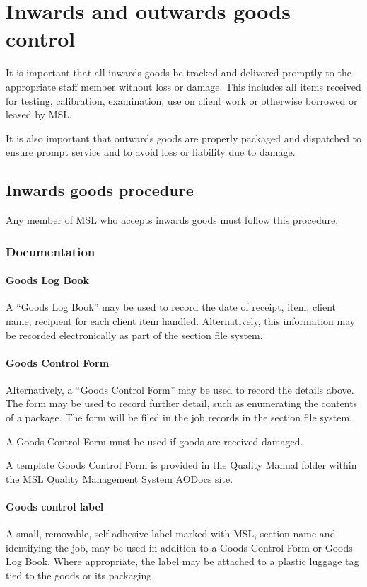 \section{Inwards and outwards goods control}
\label{s:inwards_outwards_goods}
It is important that all inwards goods be tracked and delivered promptly to the appropriate staff member without loss or damage. This includes all items received for testing, calibration, examination, use on client work or otherwise borrowed or leased by MSL.

It is also important that outwards goods are properly packaged and dispatched to ensure prompt service and to avoid loss or liability due to damage.

\subsection{Inwards goods procedure}
Any member of MSL who accepts inwards goods must follow this procedure.

\subsubsection{Documentation}
\paragraph{Goods Log Book}
A ``Goods Log Book'' may be used to record the date of receipt, item, client name, recipient for each client item handled. Alternatively, this information may be recorded electronically as part of the section file system.

\paragraph{Goods Control Form}
Alternatively, a ``Goods Control Form'' may be used to record the details above.  The form may be used to record further detail, such as enumerating the contents of a package. The form will be filed in the job records in the section file system. 

A Goods Control Form must be used if goods are received damaged.

A template Goods Control Form is provided in the Quality Manual folder within the MSL Quality Management System AODocs site.

\paragraph{Goods control label}
A small, removable, self-adhesive label marked with MSL, section name and identifying the job, may be used in addition to a Goods Control Form or Goods Log Book. Where appropriate, the label may be attached to a plastic luggage tag tied to the goods or its packaging.

